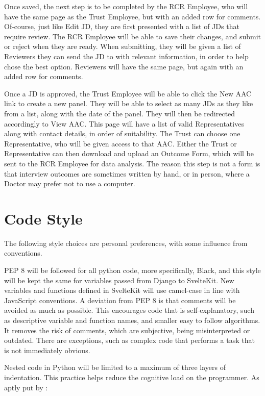 Once saved, the next step is to be completed by the RCR Employee, who will have the same page as the Trust Employee, but with an added row for comments. Of-course, just like Edit JD, they are first presented with a list of JDs that require review. The RCR Employee will be able to save their changes, and submit or reject when they are ready. When submitting, they will be given a list of Reviewers they can send the JD to with relevant information, in order to help chose the best option. Reviewers will have the same page, but again with an added row for comments. 

Once a JD is approved, the Trust Employee will be able to click the New AAC link to create a new panel. They will be able to select as many JDs as they like from a list, along with the date of the panel. They will then be redirected accordingly to View AAC. This page will have a list of valid Representatives along with contact details, in order of suitability. The Trust can choose one Representative, who will be given access to that AAC. Either the Trust or Representative can then download and upload an Outcome Form, which will be sent to the RCR Employee for data analysis. The reason this step is not a form is that interview outcomes are sometimes written by hand, or in person, where a Doctor may prefer not to use a computer.

\clearpage
\section{Code Style}
The following style choices are personal preferences, with some influence from conventions. 

PEP 8 \parencite{guido_van_rossum_pep_2013} will be followed for all python code, more specifically, Black, and this style will be kept the same for variables passed from Django to SvelteKit. New variables and functions defined in SvelteKit will use camel-case in line with JavaScript conventions. A deviation from PEP 8 is that comments will be avoided as much as possible. This encourages code that is self-explanatory, such as descriptive variable and function names, and smaller easy to follow algorithms. It removes the risk of comments, which are subjective, being misinterpreted or outdated. There are exceptions, such as complex code that performs a task that is not immediately obvious.

Nested code in Python will be limited to a maximum of three layers of indentation. This practice helps reduce the cognitive load on the programmer. As aptly put by \textcite{the_kernel_development_community_linux_2024}:

